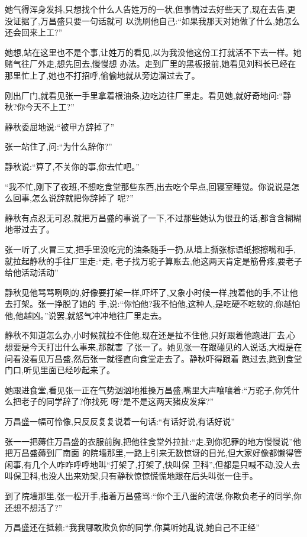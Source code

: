 ﻿\documentclass[12pt]{article}
\begin{document}
她气得浑身发抖,只想找个什么人告姓万的一状,但事情过去好些天了,现在去告,更没证据了,万昌盛只要一句话就可
以洗刷他自己:``如果我那天对她做了什么,她怎么还会回来上工?''

她想,站在这里也不是个事,让姓万的看见,以为我没他这份工打就活不下去一样。她赌气往厂外走,想先回去,慢慢想
办法。走到厂里的黑板报前,她看见刘科长已经在那里忙上了,她也不打招呼,偷偷地就从旁边溜过去了。

刚出厂门,就看见张一手里拿着根油条,边吃边往厂里走。看见她,就好奇地问:``静秋?你今天不上工?''

静秋委屈地说:``被甲方辞掉了\myrule ''

张一站住了,问:``为什么辞你?''

静秋说:``算了,不关你的事,你去忙吧。''

``我不忙,刚下了夜班,不想吃食堂那些东西,出去吃个早点,回寝室睡觉。你说说是怎么回事,怎么说辞就把你辞掉了
呢?''

静秋有点忍无可忍,就把万昌盛的事说了一下,不过那些她认为很丑的话,都含含糊糊地带过去了。

张一听了,火冒三丈,把手里没吃完的油条随手一扔,从墙上撕张标语纸擦擦嘴和手,就拉起静秋的手往厂里走:``走,
老子找万驼子算账去,他这两天肯定是筋骨疼,要老子给他活动活动\myrule ''

静秋见他骂骂咧咧的,好像要打架一样,吓坏了,又象小时候一样,拽着他的手,不让他去打架。张一挣脱了她的
手,说:``你怕他?我不怕他,这种人,是吃硬不吃软的,你越怕他,他越凶。''说罢,就怒气冲冲地往厂里走去。

静秋不知道怎么办,小时候就拉不住他,现在还是拉不住他,只好跟着他跑进厂去,心想要是今天打出什么事来,那就害
了张一了。她见张一在跟碰见的人说话,大概是在问看没看见万昌盛,然后张一就径直向食堂走去了。静秋吓得跟着
跑过去,跑到食堂门口,听见里面已经吵起来了。

她跟进食堂,看见张一正在气势汹汹地推搡万昌盛,嘴里大声嚷嚷着:``万驼子,你凭什么把老子的同学辞了?你找死
呀?是不是这两天猪皮发痒?''

万昌盛一幅可怜像,只反反复复说着一句话:``有话好说,有话好说\myrule ''

张一一把薅住万昌盛的衣服前胸,把他往食堂外拉扯:``走,到你犯罪的地方慢慢说\myrule ''他把万昌盛薅到厂南面
的院墙那里,一路上引来无数惊讶的目光,但大家好像都懒得管闲事,有几个人咋咋呼呼地叫``打架了,打架了,快叫保
卫科'',但都是只喊不动,没人去叫保卫科,也没人出来劝架,只有静秋惊惊慌慌地跟在后头叫张一住手。

到了院墙那里,张一松开手,指着万昌盛骂:``你个王八蛋的流氓,你欺负老子的同学,你还想不想活了?''

万昌盛还在抵赖:``我\myrule 我哪敢欺负你的同学,你莫听她乱说,她自己\myrule 不正经\myrule ''
\end{document}
